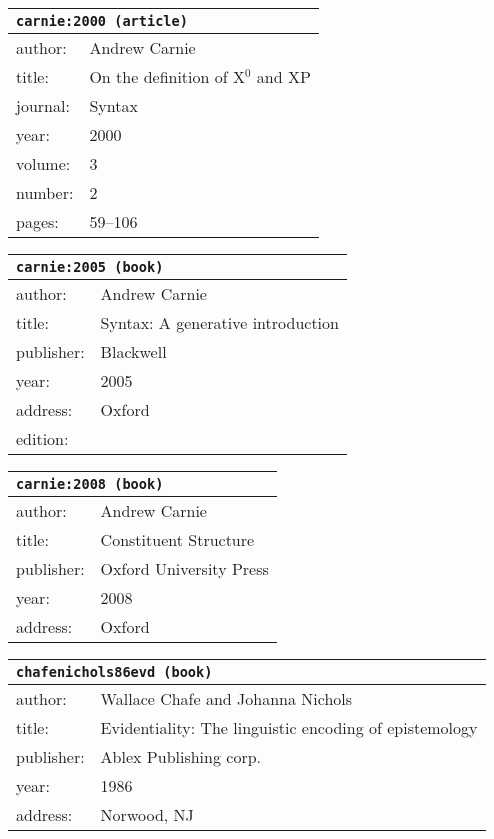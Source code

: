 \documentclass{article}
\begin{document}
\bigskip

\begin{tabular}{p{}p{}}
\multicolumn{2}{l}{\texttt{carnie:2000 (article)}}\\
\hline
author: & Andrew Carnie\\
title: & On the definition of \textsc{X$^{0}$} and \textsc{XP}\\
journal: & Syntax\\
year: & 2000\\
volume: & 3\\
number: & 2\\
pages: & 59--106\\
\end{tabular}

\bigskip

\begin{tabular}{p{}p{}}
\multicolumn{2}{l}{\texttt{carnie:2005 (book)}}\\
\hline
author: & Andrew Carnie\\
title: & Syntax: A generative introduction\\
publisher: & Blackwell\\
year: & 2005\\
address: & Oxford\\
edition: & \\
\end{tabular}

\bigskip

\begin{tabular}{p{}p{}}
\multicolumn{2}{l}{\texttt{carnie:2008 (book)}}\\
\hline
author: & Andrew Carnie\\
title: & Constituent Structure\\
publisher: & Oxford University Press\\
year: & 2008\\
address: & Oxford\\
\end{tabular}

\bigskip

\begin{tabular}{p{}p{}}
\multicolumn{2}{l}{\texttt{chafenichols86evd (book)}}\\
\hline
author: & Wallace Chafe and Johanna Nichols\\
title: & Evidentiality: The linguistic encoding of epistemology\\
publisher: & Ablex Publishing corp.\\
year: & 1986\\
address: & Norwood, NJ\\
\end{tabular}
\end{document}
